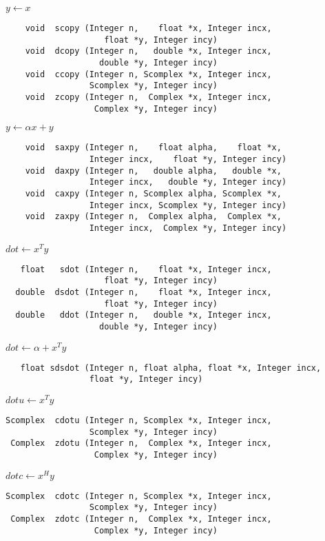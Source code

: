 \newpage
\normalsize
\noindent
$y \leftarrow x$
\footnotesize
\begin{verbatim}
    void  scopy (Integer n,    float *x, Integer incx,
                    float *y, Integer incy)
    void  dcopy (Integer n,   double *x, Integer incx,
                   double *y, Integer incy)
    void  ccopy (Integer n, Scomplex *x, Integer incx,
                 Scomplex *y, Integer incy)
    void  zcopy (Integer n,  Complex *x, Integer incx,
                  Complex *y, Integer incy)
\end{verbatim}
\normalsize
$y \leftarrow \alpha x + y$
\footnotesize
\begin{verbatim}
    void  saxpy (Integer n,    float alpha,    float *x,
                 Integer incx,    float *y, Integer incy)
    void  daxpy (Integer n,   double alpha,   double *x,
                 Integer incx,   double *y, Integer incy)
    void  caxpy (Integer n, Scomplex alpha, Scomplex *x,
                 Integer incx, Scomplex *y, Integer incy)
    void  zaxpy (Integer n,  Complex alpha,  Complex *x,
                 Integer incx,  Complex *y, Integer incy)
\end{verbatim}
\normalsize
$dot \leftarrow x^T y$
\footnotesize
\begin{verbatim}
   float   sdot (Integer n,    float *x, Integer incx,
                    float *y, Integer incy)
  double  dsdot (Integer n,    float *x, Integer incx,
                    float *y, Integer incy)
  double   ddot (Integer n,   double *x, Integer incx,
                   double *y, Integer incy)
\end{verbatim}
\normalsize
$dot \leftarrow \alpha + x^T y$
\footnotesize
\begin{verbatim}
   float sdsdot (Integer n, float alpha, float *x, Integer incx,
                 float *y, Integer incy)
\end{verbatim}
\normalsize
$dotu \leftarrow x^T y$
\footnotesize
\begin{verbatim}
Scomplex  cdotu (Integer n, Scomplex *x, Integer incx,
                 Scomplex *y, Integer incy)
 Complex  zdotu (Integer n,  Complex *x, Integer incx,
                  Complex *y, Integer incy)
\end{verbatim}
\normalsize
$dotc \leftarrow x^H y$
\footnotesize
\begin{verbatim}
Scomplex  cdotc (Integer n, Scomplex *x, Integer incx,
                 Scomplex *y, Integer incy)
 Complex  zdotc (Integer n,  Complex *x, Integer incx,
                  Complex *y, Integer incy)
\end{verbatim}
